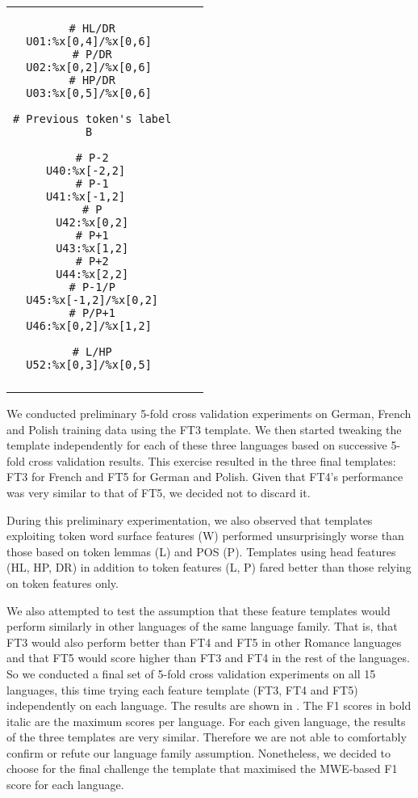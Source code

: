 \documentclass[output=paper
,modfonts
,nonflat]{langsci/langscibook}
\begin{document}
\begin{table}
{\begin{tabular}{ccc}
\begin{minipage}[t]{3.6cm}
\begin{verbatim}
# HL/DR
U01:%x[0,4]/%x[0,6] 
# P/DR
U02:%x[0,2]/%x[0,6] 
# HP/DR
U03:%x[0,5]/%x[0,6] 

# Previous token's label
B 

# P-2
U40:%x[-2,2]  
# P-1
U41:%x[-1,2]  
# P
U42:%x[0,2]
# P+1
U43:%x[1,2]
# P+2
U44:%x[2,2]
# P-1/P
U45:%x[-1,2]/%x[0,2]
# P/P+1
U46:%x[0,2]/%x[1,2] 

# L/HP
U52:%x[0,3]/%x[0,5] 
\end{verbatim}
\end{minipage}\\
\lspbottomrule
  \end{tabular}
} 
\end{table}

We conducted preliminary 5-fold cross validation experiments on German, French and
Polish training data using the FT3 template. We then started tweaking the template independently for each of these three languages based on successive 5-fold cross validation results. This exercise resulted in the three final templates: FT3 for French and FT5 for German and Polish. Given that FT4's performance was very similar to that of FT5, we decided not to discard it. 

During this preliminary experimentation, we also observed that templates exploiting token
word surface features (W) performed unsurprisingly worse than those
based on token lemmas (L) and POS (P). Templates using head features
(HL, HP, DR) in addition to token features (L, P) fared better than
those relying on token features only. 

We also attempted to test the assumption that these feature templates would perform similarly in other languages of the same language family. That is, that FT3 would also perform better than FT4 and FT5 in other Romance languages and that FT5 would score higher than FT3 and FT4 in the rest of the languages. So we conducted a final set of 5-fold cross validation experiments on all 15 languages, this time trying each feature template (FT3, FT4 and FT5) independently on each language. The results are shown in . The F1 scores in bold italic are the maximum scores per language. For each given language, the results of the three templates are very similar. Therefore we are not able to comfortably confirm or refute our language family assumption. Nonetheless, we decided to choose for the final challenge the template that maximised the MWE-based F1 score for each language.
\end{document}
